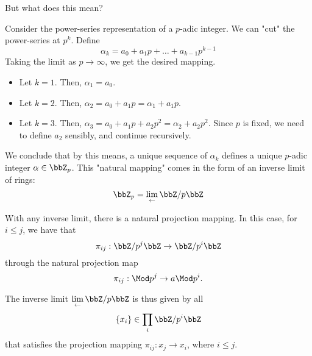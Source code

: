 \documentclass[a4paper, 12pt,oneside,openany]{book}
\begin{document}


But what does this mean? 

Consider the power-series representation of a $p$-adic integer. We can "cut" the power-series at $p^k$. Define $$\alpha_k=a_0+a_1p+\dots+a_{k-1}p^{k-1}$$ Taking the limit as $p\to\infty$, we get the desired mapping.

\begin{itemize}
	\item Let $k=1$. Then, $\alpha_1=a_0. $
	\item Let $k=2$. Then, $\alpha_2=a_0+a_1p=\alpha_1+a_1p$. 
	\item Let $k=3$. Then, $\alpha_3=a_0+a_1p+a_2p^2=\alpha_2+a_2p^2$. Since $p$ is fixed, we need to define $a_2$ sensibly, and continue recursively. 
\end{itemize}

We conclude that by this means, a unique sequence of $\alpha_k$ defines a unique $p$-adic integer $\alpha \in \bbZ_p$. This "natural mapping" comes in the form of an inverse limit of rings: $$\bbZ_p = \lim\limits_\leftarrow\bbZ/p\bbZ$$

With any inverse limit, there is a natural projection mapping. In this case, for $i \leq j$, we have that $$\pi_{ij}: \bbZ/p^j\bbZ \to \bbZ/p^i \bbZ$$ through the natural projection map $$\pi_{ij}:  \Mod p^j \to a \Mod p^i.$$

The inverse limit $\lim\limits_\leftarrow\bbZ/p\bbZ$ is thus given by all $$\{x_i\} \in \prod\limits_i \bbZ/p^i\bbZ$$ that satisfies the projection mapping $\pi_{ij}:x_j \to x_i$, where $i\leq j$.

\end{document}

